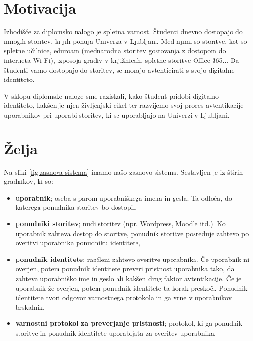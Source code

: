 \documentclass[a4paper,12pt,openright,oneside]{book}
\begin{document}
\section{Motivacija}
Izhodišče za diplomsko nalogo je spletna varnost. Študenti dnevno dostopajo do mnogih storitev, ki jih ponuja Univerza v Ljubljani. Med njimi so storitve, kot so spletne učilnice, eduroam (mednarodna storitev gostovanja z dostopom do interneta Wi-Fi), izposoja gradiv v knjižnicah, spletne storitve Office 365... Da študenti varno dostopajo do storitev, se morajo avtenticirati s svojo digitalno identiteto. 

V sklopu diplomske naloge smo raziskali, kako študent pridobi digitalno identiteto, kakšen je njen življenjski cikel ter razvijemo svoj proces avtentikacije uporabnikov pri uporabi storitev, ki se uporabljajo na Univerzi v Ljubljani.

\section{Želja}
\label{zelja}
Na sliki \ref{fig:zasnova sistema} imamo našo zasnovo sistema. Sestavljen je iz štirih gradnikov, ki so:
\begin{itemize}
    \item \textbf{uporabnik}; oseba s parom uporabniškega imena in gesla. Ta odloča, do katerega ponudnika storitev bo dostopil, 
    \item \textbf{ponudniki storitev}; nudi storitev (npr. Wordpress, Moodle itd.). Ko uporabnik zahteva dostop do storitve, ponudnik storitve posreduje zahtevo po overitvi uporabnika ponudniku identitete,
    \item \textbf{ponudnik identitete}; razčleni zahtevo overitve uporabnika. Če uporabnik ni overjen, potem ponudnik identitete preveri pristnost uporabnika tako, da zahteva uporabniško ime in geslo ali kakšen drug faktor avtentikacije. Če je uporabnik že overjen, potem ponudnik identitete ta korak preskoči. Ponudnik identitete tvori odgovor varnostnega protokola in ga vrne v uporabnikov brskalnik,
    \item \textbf{varnostni protokol za preverjanje pristnosti}; protokol, ki ga ponudnik storitve in ponudnik identitete uporabljata za overitev uporabnika. 
\end{itemize}
\end{document}
